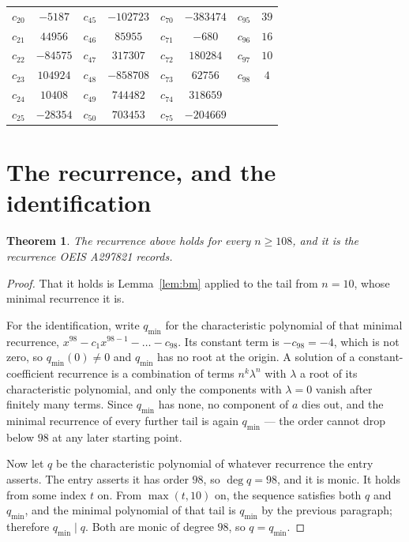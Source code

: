 \documentclass[11pt,a4paper]{article}
\theoremstyle{plain}
\newtheorem{theorem}{Theorem}
\theoremstyle{definition}
\begin{document}
\begin{center}
\begin{tabular}{cccccccc}
$c_{20}$ & $-5187$ & $c_{45}$ & $-102723$ & $c_{70}$ & $-383474$ & $c_{95}$ & $39$ \\
$c_{21}$ & $44956$ & $c_{46}$ & $85955$ & $c_{71}$ & $-680$ & $c_{96}$ & $16$ \\
$c_{22}$ & $-84575$ & $c_{47}$ & $317307$ & $c_{72}$ & $180284$ & $c_{97}$ & $10$ \\
$c_{23}$ & $104924$ & $c_{48}$ & $-858708$ & $c_{73}$ & $62756$ & $c_{98}$ & $4$ \\
$c_{24}$ & $10408$ & $c_{49}$ & $744482$ & $c_{74}$ & $318659$ &  &  \\
$c_{25}$ & $-28354$ & $c_{50}$ & $703453$ & $c_{75}$ & $-204669$ &  &  \\
\end{tabular}
\end{center}

\section{The recurrence, and the identification}

\begin{theorem}
The recurrence above holds for every $n\ge108$, and it is the recurrence OEIS A297821 records.
\end{theorem}

\begin{proof}
That it holds is Lemma~\ref{lem:bm} applied to the tail from $n=10$, whose minimal
recurrence it is.

For the identification, write $q_{\min}$ for the characteristic polynomial of that minimal
recurrence, $x^{98}-c_1x^{98-1}-\dots-c_{98}$. Its constant term is
$-c_{98}=-4$, which is not zero, so $q_{\min}(0)\neq0$ and $q_{\min}$ has no
root at the origin. A solution of a constant-coefficient recurrence is a combination of terms
$n^{k}\lambda^{n}$ with $\lambda$ a root of its characteristic polynomial, and only the
components with $\lambda=0$ vanish after finitely many terms. Since $q_{\min}$ has none, no
component of $a$ dies out, and the minimal recurrence of every further tail is again
$q_{\min}$ --- the order cannot drop below $98$ at any later starting point.

Now let $q$ be the characteristic polynomial of whatever recurrence the entry asserts. The
entry asserts it has order $98$, so $\deg q=98$, and it is monic. It holds from some
index $t$ on. From $\max(t,10)$ on, the sequence satisfies both $q$ and $q_{\min}$, and
the minimal polynomial of that tail is $q_{\min}$ by the previous paragraph; therefore
$q_{\min}\mid q$. Both are monic of degree $98$, so $q=q_{\min}$.
\end{proof}
\end{document}
